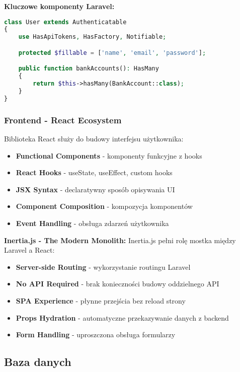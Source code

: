 \documentclass[12pt,a4paper]{article}
\begin{document}
    \textbf{Kluczowe komponenty Laravel:}

    \begin{lstlisting}[language=PHP, caption=Przykład modelu User]
class User extends Authenticatable
{
    use HasApiTokens, HasFactory, Notifiable;

    protected $fillable = ['name', 'email', 'password'];

    public function bankAccounts(): HasMany
    {
        return $this->hasMany(BankAccount::class);
    }
}
    \end{lstlisting}

    \subsubsection{Frontend - React Ecosystem}

    Biblioteka React służy do budowy interfejsu użytkownika:

    \begin{itemize}
        \item \textbf{Functional Components} - komponenty funkcyjne z hooks
        \item \textbf{React Hooks} - useState, useEffect, custom hooks
        \item \textbf{JSX Syntax} - declaratywny sposób opisywania UI
        \item \textbf{Component Composition} - kompozycja komponentów
        \item \textbf{Event Handling} - obsługa zdarzeń użytkownika
    \end{itemize}

    \textbf{Inertia.js - The Modern Monolith:}
    Inertia.js pełni rolę mostka między Laravel a React:

    \begin{itemize}
        \item \textbf{Server-side Routing} - wykorzystanie routingu Laravel
        \item \textbf{No API Required} - brak konieczności budowy oddzielnego API
        \item \textbf{SPA Experience} - płynne przejścia bez reload strony
        \item \textbf{Props Hydration} - automatyczne przekazywanie danych z backend
        \item \textbf{Form Handling} - uproszczona obsługa formularzy
    \end{itemize}

    \subsection{Baza danych}
\end{document}
